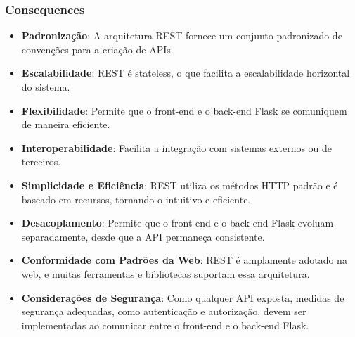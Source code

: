 \subsubsection*{Consequences}
\begin{itemize}
	\item \textbf{Padronização}: A arquitetura REST fornece um conjunto padronizado de convenções para a criação de APIs.
	\item \textbf{Escalabilidade}: REST é stateless, o que facilita a escalabilidade horizontal do sistema.
	\item \textbf{Flexibilidade}: Permite que o front-end e o back-end Flask se comuniquem de maneira eficiente.
	\item \textbf{Interoperabilidade}: Facilita a integração com sistemas externos ou de terceiros.
	\item \textbf{Simplicidade e Eficiência}: REST utiliza os métodos HTTP padrão e é baseado em recursos, tornando-o intuitivo e eficiente.
	\item \textbf{Desacoplamento}: Permite que o front-end e o back-end Flask evoluam separadamente, desde que a API permaneça consistente.
	\item \textbf{Conformidade com Padrões da Web}: REST é amplamente adotado na web, e muitas ferramentas e bibliotecas suportam essa arquitetura.
	\item \textbf{Considerações de Segurança}: Como qualquer API exposta, medidas de segurança adequadas, como autenticação e autorização, devem ser implementadas ao comunicar entre o front-end e o back-end Flask.
\end{itemize}

\newpage